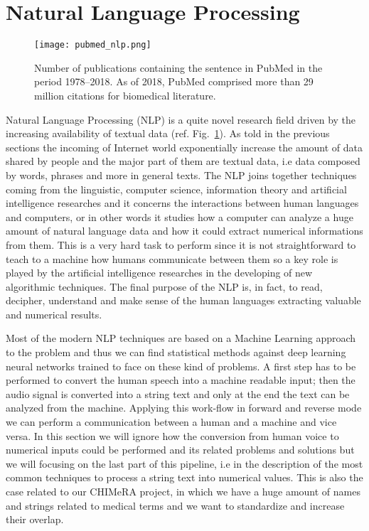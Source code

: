 \documentclass{standalone}
\begin{document}
\section[NLP]{Natural Language Processing}\label{chimera:nlp}


\begin{center}
\begin{figure}[htbp]
\centering
\texttt{[image: pubmed\_nlp.png]}
\caption{Number of publications containing the sentence  in PubMed in the period 1978–2018.
As of 2018, PubMed comprised more than 29 million citations for biomedical literature.
}
\label{fig:pubmed_nlp}
\end{figure}
\end{center}


Natural Language Processing (NLP) is a quite novel research field driven by the increasing availability of textual data (ref. Fig.~\ref{fig:pubmed_nlp}).
As told in the previous sections the incoming of Internet world exponentially increase the amount of data shared by people and the major part of them are textual data, i.e data composed by words, phrases and more in general texts.
The NLP joins together techniques coming from the linguistic, computer science, information theory and artificial intelligence researches and it concerns the interactions between human languages and computers, or in other words it studies how a computer can analyze a huge amount of natural language data and how it could extract numerical informations from them.
This is a very hard task to perform since it is not straightforward to teach to a machine how humans communicate between them so a key role is played by the artificial intelligence researches in the developing of new algorithmic techniques.
The final purpose of the NLP is, in fact, to read, decipher, understand and make sense of the human languages extracting valuable and numerical results.

Most of the modern NLP techniques are based on a Machine Learning approach to the problem and thus we can find statistical methods against deep learning neural networks trained to face on these kind of problems.
A first step has to be performed to convert the human speech into a machine readable input; then the audio signal is converted into a string text and only at the end the text can be analyzed from the machine.
Applying this work-flow in forward and reverse mode we can perform a communication between a human and a machine and vice versa.
In this section we will ignore how the conversion from human voice to numerical inputs could be performed and its related problems and solutions but we will focusing on the last part of this pipeline, i.e in the description of the most common techniques to process a string text into numerical values.
This is also the case related to our CHIMeRA project, in which we have a huge amount of names and strings related to medical terms and we want to standardize and increase their overlap.
\end{document}

